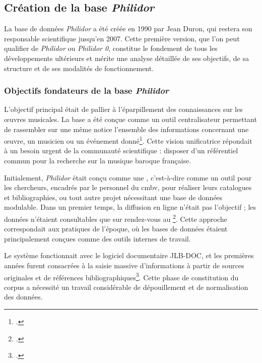 \subsection{Création de la base \textit{Philidor}}

La base de données \textit{Philidor} a été créée en 1990 par Jean Duron, qui restera son responsable scientifique jusqu'en 2007. Cette première version, que l'on peut qualifier de \textit{Philidor} ou \textit{Philidor 0}, constitue le fondement de tous les développements ultérieurs et mérite une analyse détaillée de ses objectifs, de sa structure et de ses modalités de fonctionnement.

\subsubsection{Objectifs fondateurs de la base \textit{Philidor}}

L'objectif principal était de pallier à l'éparpillement des connaissances sur les œuvres musicales. La base a été conçue comme un outil centralisateur permettant de rassembler sur une même notice l'ensemble des informations concernant une œuvre, un musicien ou un événement donné\footcite[Présentation de la base de données PHILIDOR en Février 2004]{michelbenoitDocumentationTechniqueBibliographique1997}. Cette vision unificatrice répondait à un besoin urgent de la communauté scientifique : disposer d'un référentiel commun pour la recherche sur la musique baroque française.

Initialement, \textit{Philidor} était conçu comme une , c'est-à-dire comme un outil pour les chercheurs, encadrés par le personnel du \gls{cmbv}, pour réaliser leurs catalogues et bibliographies, ou tout autre projet nécessitant une base de données modulable. Dans un premier temps, la diffusion en ligne n'était pas l'objectif ; les données n'étaient consultables que sur rendez-vous au \footcite[Présentation de la base de données PHILIDOR en Octobre 2010]{michelbenoitDocumentationTechniqueBibliographique1997}. Cette approche  correspondait aux pratiques de l'époque, où les bases de données étaient principalement conçues comme des outils internes de travail.

Le système fonctionnait avec le logiciel documentaire JLB-DOC, et les premières années furent consacrées à la saisie massive d'informations à partir de sources originales et de références bibliographiques\footcite[Présentation de la base de données PHILIDOR en Octobre 2010]{michelbenoitDocumentationTechniqueBibliographique1997}. Cette phase de constitution du corpus a nécessité un travail considérable de dépouillement et de normalisation des données.

